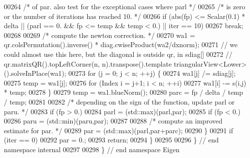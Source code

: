 \begin{DoxyCode}
00264         \textcolor{comment}{/* of par. also test for the exceptional cases where parl */}
00265         \textcolor{comment}{/* is zero or the number of iterations has reached 10. */}
00266         \textcolor{keywordflow}{if} (abs(fp) <= Scalar(0.1) * delta || (parl == 0. && fp <= temp && temp < 0.) || iter == 10)
00267             \textcolor{keywordflow}{break};
00268 
00269         \textcolor{comment}{/* compute the newton correction. */}
00270         wa1 = qr.colsPermutation().inverse() * diag.cwiseProduct(wa2/dxnorm);
00271         \textcolor{comment}{// we could almost use this here, but the diagonal is outside qr, in sdiag[]}
00272         \textcolor{comment}{// qr.matrixQR().topLeftCorner(n, n).transpose().template
       triangularView<Lower>().solveInPlace(wa1);}
00273         \textcolor{keywordflow}{for} (j = 0; j < n; ++j) \{
00274             wa1[j] /= sdiag[j];
00275             temp = wa1[j];
00276             \textcolor{keywordflow}{for} (Index i = j+1; i < n; ++i)
00277                 wa1[i] -= s(i,j) * temp;
00278         \}
00279         temp = wa1.blueNorm();
00280         parc = fp / delta / temp / temp;
00281 
00282         \textcolor{comment}{/* depending on the sign of the function, update parl or paru. */}
00283         \textcolor{keywordflow}{if} (fp > 0.)
00284             parl = (std::max)(parl,par);
00285         \textcolor{keywordflow}{if} (fp < 0.)
00286             paru = (std::min)(paru,par);
00287 
00288         \textcolor{comment}{/* compute an improved estimate for par. */}
00289         par = (std::max)(parl,par+parc);
00290     \}
00291     \textcolor{keywordflow}{if} (iter == 0)
00292         par = 0.;
00293     \textcolor{keywordflow}{return};
00294 \}
00295 
00296 \} \textcolor{comment}{// end namespace internal}
00297 
00298 \} \textcolor{comment}{// end namespace Eigen}
\end{DoxyCode}
